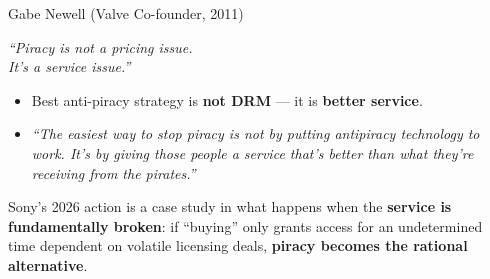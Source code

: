 \documentclass[aspectratio=169,11pt]{beamer}
\begin{document}
	\begin{frame}{Gabe Newell (Valve Co-founder, 2011)}
		\vspace{0.3cm}
		\begin{quotebox}
			\centering\large\itshape\color{ctpPink}
			``Piracy is not a pricing issue.\\[0.1cm] It's a service issue.''
		\end{quotebox}
		\vspace{0.5cm}
		\begin{itemize}\itemsep0.6em
			\item Best anti-piracy strategy is \textbf{not DRM} --- it is \textbf{better service}.
			\item \emph{``The easiest way to stop piracy is not by putting antipiracy technology to work. It's by giving those people a service that's better than what they're receiving from the pirates.''}
		\end{itemize}
		\vspace{0.3cm}
		\begin{successbox}
			Sony's 2026 action is a case study in what happens when the \textbf{service is fundamentally broken}: if ``buying'' only grants access for an undetermined time dependent on volatile licensing deals, \textbf{piracy becomes the rational alternative}.
		\end{successbox}
	\end{frame}
	
\end{document}
